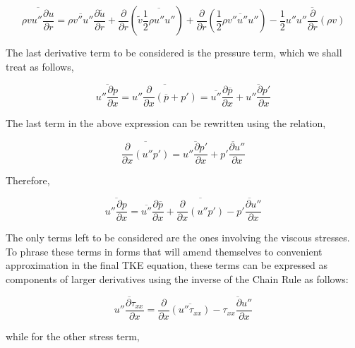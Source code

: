 \begin{equation}
	\overline{\rho v u'' \frac{\partial u}{\partial r}} = \overline{\rho v'' u''}\frac{\partial \tilde u}{\partial r}
	+ \frac{\partial}{\partial r}(\tilde v \overline{\frac{1}{2}\rho u'' u''}) + \frac{\partial}{\partial r}(\frac{1}{2}
	\overline{\rho v'' u'' u''})- \overline{\frac{1}{2}u''u''\frac{\partial}{\partial r}(\rho v)}
\label{eqn:rderivterm}
\end{equation}

	The last derivative term to be considered is the pressure term, which we shall treat as follows,

\begin{displaymath}
	\overline{u''\frac{\partial p}{\partial x}} = \overline{u''\frac{\partial}{\partial x}(\overline{p} + p')} = 
	\overline{u''}\frac{\partial \overline{p}}{\partial x} + \overline{u''\frac{\partial p'}{\partial x}}
\end{displaymath}

	The last term in the above expression can be rewritten using the relation,

\begin{displaymath}
	\overline{\frac{\partial}{\partial x}(u''p')} = \overline {u''\frac{\partial p'}{\partial x}} + \overline {p'\frac
	{\partial u''}{\partial x}}
\end{displaymath}

	Therefore,

\begin{equation}
	\overline{u''\frac{\partial p}{\partial x}} = \overline{u''}\frac{\partial \overline{p}}{\partial x} 
	+ \overline{\frac{\partial}{\partial x}(u''p')} - \overline {p'\frac{\partial u''}{\partial x}}
\label{eqn:pderivterm}
\end{equation}

	The only terms left to be considered are the ones involving the viscous stresses.  To phrase these terms in 
forms that will amend themselves to convenient approximation in the final TKE equation, these terms can be expressed
as components of larger derivatives using the inverse of the Chain Rule as follows:

\begin{equation}
	\overline{u''\frac{\partial \tau_{xx}}{\partial x}} = \frac{\partial}{\partial x}\overline{(u''\tau_{xx})} -
	\overline{\tau_{xx}\frac{\partial u''}{\partial x}}
\label{eqn:tauxxterm}
\end{equation}
	
	while for the other stress term,

